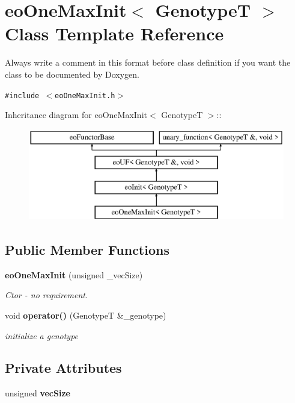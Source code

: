 \section{eo\-One\-Max\-Init$<$ Genotype\-T $>$ Class Template Reference}
\label{classeo_one_max_init}
Always write a comment in this format before class definition if you want the class to be documented by Doxygen.  


{\tt \#include $<$eo\-One\-Max\-Init.h$>$}

Inheritance diagram for eo\-One\-Max\-Init$<$ Genotype\-T $>$::\begin{figure}[H]
\begin{center}
\leavevmode
\includegraphics[height=4cm]{classeo_one_max_init}
\end{center}
\end{figure}
\subsection*{Public Member Functions}
\begin{CompactItemize}
\item 
{\bf eo\-One\-Max\-Init} (unsigned \_\-vec\-Size)\label{classeo_one_max_init_a0}

\begin{CompactList}\small\item\em Ctor - no requirement. \item\end{CompactList}\item 
void {\bf operator()} (Genotype\-T \&\_\-genotype)
\begin{CompactList}\small\item\em initialize a genotype \item\end{CompactList}\end{CompactItemize}
\subsection*{Private Attributes}
\begin{CompactItemize}
\item 
unsigned {\bf vec\-Size}\label{classeo_one_max_init_r0}

\end{CompactItemize}


